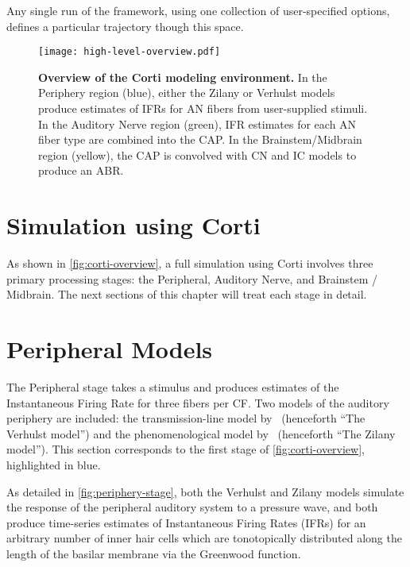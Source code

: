 Any single run of the framework, using one collection of user-specified options, defines a particular trajectory though this space.

\begin{figure}[htbp]
	\centering
	\texttt{[image: high-level-overview.pdf]}
	\captionsetup{width=6in}
	\caption[Overview of the Corti Modeling Environment.]{\textbf{Overview of the Corti modeling environment.}  In the Periphery region (blue), either the Zilany or Verhulst models produce estimates of IFRs for AN fibers from user-supplied stimuli.  In the Auditory Nerve region (green), IFR estimates for each AN fiber type are combined into the CAP.  In the Brainstem/Midbrain region (yellow), the CAP is convolved with CN and IC models to produce an ABR.}
	\label{fig:corti-overview}
	\end{figure}

\section{Simulation using Corti} %
\label{sec:simulation_using_corti}
As shown in \autoref{fig:corti-overview}, a full simulation using Corti involves three primary processing stages: the Peripheral, Auditory Nerve, and Brainstem / Midbrain. The next sections of this chapter will treat each stage in detail. 

\section{Peripheral Models} %
\label{sec:peripheral_models}
The Peripheral stage takes a stimulus and produces estimates of the Instantaneous Firing Rate for three fibers per CF.  Two models of the auditory periphery are included: the transmission-line model by~\cite{Verhulst2015Functional} (henceforth ``The Verhulst model'') and the phenomenological model by~\cite{Zilany2014Updated} (henceforth ``The Zilany model'').  This section corresponds to the first stage of \autoref{fig:corti-overview}, highlighted in blue.

As detailed in \autoref{fig:periphery-stage}, both the Verhulst and Zilany models simulate the response of the peripheral auditory system to a pressure wave, and both produce time-series estimates of Instantaneous Firing Rates (IFRs) for an arbitrary number of inner hair cells which are tonotopically distributed along the length of the basilar membrane via the Greenwood function.

